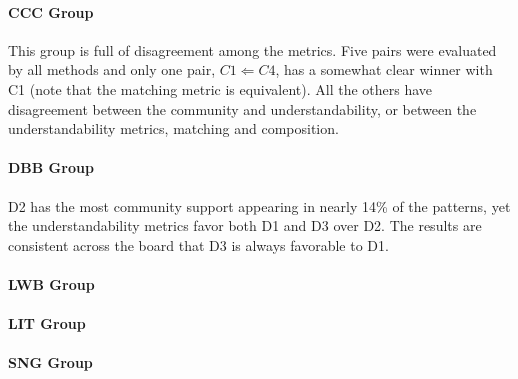 







\paragraph{CCC Group}
This group is full of disagreement among the metrics. Five pairs were evaluated by all methods and only one pair, $C1 \Leftarrow C4$, has a somewhat clear winner with C1 (note that the matching metric is equivalent). All the others have disagreement between the community and understandability, or between the understandability metrics, matching and composition. 


\paragraph{DBB Group}
D2 has the most community support appearing in nearly 14\% of the patterns, yet the understandability metrics favor both D1 and D3 over D2. The results are consistent across the board that D3 is always favorable to D1. 

\paragraph{LWB Group}

\paragraph{LIT Group}

\paragraph{SNG Group}






